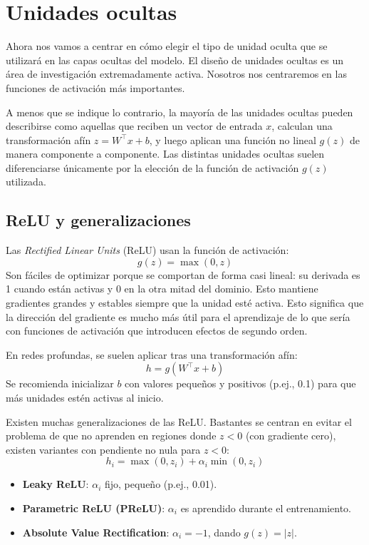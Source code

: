 \section{Unidades ocultas}
Ahora nos vamos a centrar en cómo elegir el tipo de unidad oculta que se utilizará en las capas ocultas del modelo. El diseño de unidades ocultas es un área de investigación extremadamente activa. Nosotros nos centraremos en las funciones de activación más importantes. 

A menos que se indique lo contrario, la mayoría de las unidades ocultas pueden describirse como aquellas que reciben un vector de entrada $x$, calculan una transformación afín $z = W^\top x + b$, y luego aplican una función no lineal $g(z)$ de manera componente a componente. Las distintas unidades ocultas suelen diferenciarse únicamente por la elección de la función de activación $g(z)$ utilizada.

\subsection{ReLU y generalizaciones}

Las \textit{Rectified Linear Units} (ReLU) usan la función de activación:
\[
g(z) = \max(0, z)
\]
Son fáciles de optimizar porque se comportan de forma casi lineal: su derivada es 1 cuando están activas y 0 en la otra mitad del dominio. Esto mantiene gradientes grandes y estables siempre que la unidad esté activa. Esto significa que la dirección del gradiente es mucho más útil para el aprendizaje de lo que sería con funciones de activación que introducen efectos de segundo orden.

En redes profundas, se suelen aplicar tras una transformación afín:
\[
h = g(W^\top x + b)
\]
Se recomienda inicializar $b$ con valores pequeños y positivos (p.ej., 0.1) para que más unidades estén activas al inicio.

Existen muchas generalizaciones de las ReLU. Bastantes se centran en evitar el problema de que no aprenden en regiones donde $z<0$ (con gradiente cero), existen variantes con pendiente no nula para $z<0$:
\[
h_i = \max(0, z_i) + \alpha_i \min(0, z_i)
\]
\begin{itemize}
    \item \textbf{Leaky ReLU}: $\alpha_i$ fijo, pequeño (p.ej., 0.01).
    \item \textbf{Parametric ReLU (PReLU)}: $\alpha_i$ es aprendido durante el entrenamiento.
    \item \textbf{Absolute Value Rectification}: $\alpha_i = -1$, dando $g(z) = |z|$.
\end{itemize}

